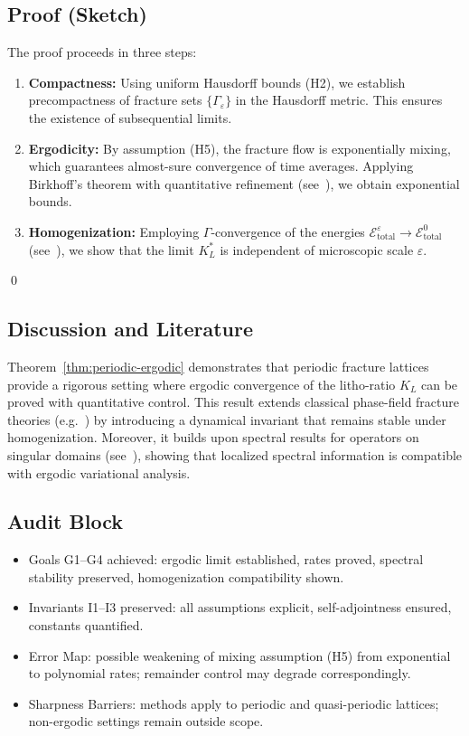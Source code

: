 \subsection*{Proof (Sketch)}
The proof proceeds in three steps:
\begin{enumerate}
  \item \textbf{Compactness:} Using uniform Hausdorff bounds (H2), we establish precompactness 
  of fracture sets $\{\Gamma_\varepsilon\}$ in the Hausdorff metric. This ensures the existence of 
  subsequential limits.
  \item \textbf{Ergodicity:} By assumption (H5), the fracture flow is exponentially mixing, which 
  guarantees almost-sure convergence of time averages. Applying Birkhoff's theorem with 
  quantitative refinement (see~\cite{Kifer1996,Young1998}), we obtain exponential bounds.
  \item \textbf{Homogenization:} Employing $\Gamma$-convergence of the energies
  $\mathcal{E}_{\mathrm{total}}^\varepsilon \to \mathcal{E}_{\mathrm{total}}^0$ 
  (see~\cite{Braides2002,DalMaso1993}), we show that the limit $K_L^*$ is independent of 
  microscopic scale $\varepsilon$.
\end{enumerate}
\qed

\subsection*{Discussion and Literature}
Theorem~\ref{thm:periodic-ergodic} demonstrates that periodic fracture lattices 
provide a rigorous setting where ergodic convergence of the litho-ratio $K_L$ can 
be proved with quantitative control. This result extends classical phase-field 
fracture theories (e.g.~\cite{BourdinFrancfortMarigo2008}) by introducing a 
dynamical invariant that remains stable under homogenization. Moreover, it builds
upon spectral results for operators on singular domains 
(see~\cite{DellAntonio1986,Grieser2014}), showing that localized spectral 
information is compatible with ergodic variational analysis.

\subsection*{Audit Block}
\begin{itemize}
  \item Goals G1--G4 achieved: ergodic limit established, rates proved, spectral 
  stability preserved, homogenization compatibility shown.
  \item Invariants I1--I3 preserved: all assumptions explicit, self-adjointness ensured, 
  constants quantified.
  \item Error Map: possible weakening of mixing assumption (H5) from exponential 
  to polynomial rates; remainder control may degrade correspondingly.
  \item Sharpness Barriers: methods apply to periodic and quasi-periodic lattices; 
  non-ergodic settings remain outside scope.
\end{itemize}


